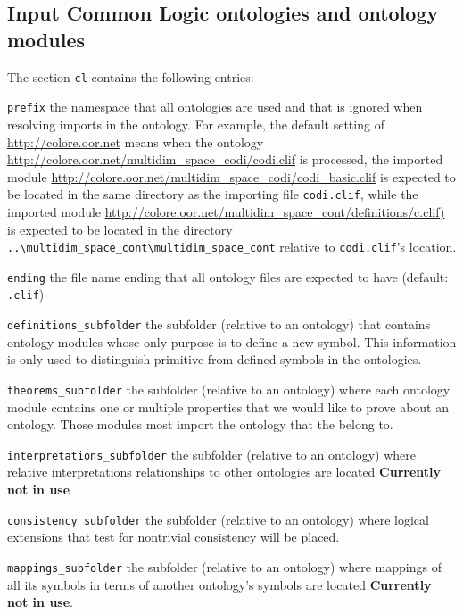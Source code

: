 \documentclass{article}
\begin{document}
\subsection{Input Common Logic ontologies and ontology modules}

The section \texttt{cl} contains the following entries:

\begin{description}
\item \texttt{prefix} the namespace that all ontologies are used and that is ignored when resolving imports in the ontology. For example, the default setting of \url{http://colore.oor.net} means when the ontology \url{http://colore.oor.net/multidim\_space\_codi/codi.clif}  is processed, the imported module \url{http://colore.oor.net/multidim\_space\_codi/codi\_basic.clif} is expected to be located in the same directory as the importing file \texttt{codi.clif}, while the imported module \url{http://colore.oor.net/multidim\_space\_cont/definitions/c.clif)} is expected to be located in the directory \texttt{..\textbackslash multidim\_space\_cont\textbackslash multidim\_space\_cont} relative to \texttt{codi.clif}'s location.
\item \texttt{ending} the file name  ending that all ontology files are expected to have (default: \texttt{.clif})
\item \texttt{definitions\_subfolder} the subfolder (relative to an ontology) that contains ontology modules whose only purpose is to define a new symbol. This information is only used to distinguish primitive from defined symbols in the ontologies. 
\item \texttt{theorems\_subfolder}  the subfolder (relative to an ontology) where each ontology module contains one or multiple properties that we would like to prove about an ontology. Those modules most import the ontology that the belong to. 
\item \texttt{interpretations\_subfolder} the subfolder (relative to an ontology) where relative interpretations relationships to other ontologies are located  \textbf{Currently not in use}
\item \texttt{consistency\_subfolder} the subfolder (relative to an ontology) where logical extensions that test for nontrivial consistency will be placed. 
\item \texttt{mappings\_subfolder} the subfolder (relative to an ontology) where mappings of all its symbols in terms of another ontology's symbols are located \textbf{Currently not in use}.
\end{description}
\end{document}
